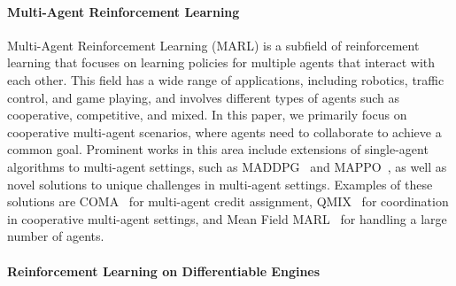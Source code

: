 \paragraph{Multi-Agent Reinforcement Learning}
Multi-Agent Reinforcement Learning (MARL) is a subfield of reinforcement learning that focuses on learning policies for multiple agents that interact with each other. 
This field has a wide range of applications, 
including robotics, 
traffic control, 
and game playing, 
and involves different types of agents such as cooperative, competitive, and mixed. 
In this paper, we primarily focus on cooperative multi-agent scenarios, 
where agents need to collaborate to achieve a common goal. 
Prominent works in this area include extensions of single-agent algorithms to multi-agent settings, 
such as MADDPG~\cite{DBLP:conf/nips/LoweWTHAM17} and MAPPO~\cite{DBLP:conf/nips/YuVVGWBW22}, 
as well as novel solutions to unique challenges in multi-agent settings. Examples of these solutions are COMA~\cite{DBLP:conf/aaai/FoersterFANW18} for multi-agent credit assignment, 
QMIX~\cite{DBLP:conf/icml/RashidSWFFW18} for coordination in cooperative multi-agent settings, 
and Mean Field MARL~\cite{DBLP:conf/icml/YangLLZZW18} for handling a large number of agents.

\paragraph{Reinforcement Learning on Differentiable Engines}


